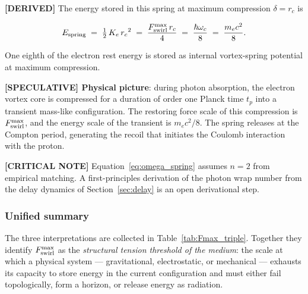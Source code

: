 \documentclass[11pt]{article}
\theoremstyle{definition}
\theoremstyle{plain}
\theoremstyle{remark}
\newcommand{\rc}{{r_c}}
\begin{document}
        \textbf{[DERIVED]} The energy stored in this spring at maximum compression $\delta = \rc$ is

        \begin{align}
            E_{\rm spring}
            \;=\; \tfrac{1}{2}\,K_e\,\rc^2
            \;=\; \frac{F_{\rm swirl}^{\max}\,\rc}{4}
            \;=\; \frac{\hbar\omega_c}{8}
            \;=\; \frac{m_e c^2}{8}.
            \label{eq:Espring}
        \end{align}

        One eighth of the electron rest energy is stored as internal vortex-spring potential at maximum compression.

        \textbf{[SPECULATIVE] Physical picture}: during photon absorption, the electron vortex core is compressed for a duration of order one Planck time $t_p$ into a transient mass-like configuration. The restoring force scale of this compression is $F_{\rm swirl}^{\max}$, and the energy scale of the transient is $m_e c^2/8$. The spring releases at the Compton period, generating the recoil that initiates the Coulomb interaction with the proton.

        \textbf{[CRITICAL NOTE]} Equation~\eqref{eq:omega_spring} assumes $n=2$ from empirical matching. A first-principles derivation of the photon wrap number from the delay dynamics of Section~\ref{sec:delay} is an open derivational step.

        \subsubsection{Unified summary}

        The three interpretations are collected in Table~\ref{tab:Fmax_triple}. Together they identify $F_{\rm swirl}^{\max}$ as the \emph{structural tension threshold of the medium}: the scale at which a physical system --- gravitational, electrostatic, or mechanical --- exhausts its capacity to store energy in the current configuration and must either fail topologically, form a horizon, or release energy as radiation.
\end{document}
